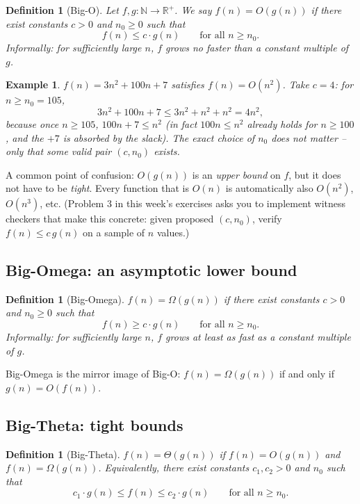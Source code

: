 \documentclass[11pt]{article}
\newtheorem{definition}[theorem]{Definition}
\newtheorem{example}[theorem]{Example}
\begin{document}
\begin{definition}[Big-O]
Let $f, g : \mathbb{N} \to \mathbb{R}^{+}$. We say $f(n) = O(g(n))$ if there exist
constants $c > 0$ and $n_0 \ge 0$ such that
\[
  f(n) \le c \cdot g(n) \qquad \text{for all } n \ge n_0.
\]
Informally: \emph{for sufficiently large $n$, $f$ grows no faster than a constant multiple
of $g$.}
\end{definition}

\begin{example}
$f(n) = 3n^2 + 100n + 7$ satisfies $f(n) = O(n^2)$. Take $c = 4$: for $n \ge n_0 = 105$,
\[
  3n^2 + 100n + 7 \le 3n^2 + n^2 + n^2 = 4n^2,
\]
because once $n \ge 105$, $100n + 7 \le n^2$ (in fact $100n \le n^2$ already holds for $n
\ge 100$, and the $+7$ is absorbed by the slack). The exact choice of $n_0$ does not matter
-- only that \emph{some} valid pair $(c, n_0)$ exists.
\end{example}

A common point of confusion: $O(g(n))$ is an \emph{upper bound} on $f$, but it does not
have to be \emph{tight}. Every function that is $O(n)$ is automatically also $O(n^2)$,
$O(n^3)$, etc. (Problem 3 in this week's exercises asks you to implement witness checkers
that make this concrete: given proposed $(c, n_0)$, verify $f(n) \le c\,g(n)$ on a sample of
$n$ values.)

\subsection{Big-Omega: an asymptotic lower bound}

\begin{definition}[Big-Omega]
$f(n) = \Omega(g(n))$ if there exist constants $c > 0$ and $n_0 \ge 0$ such that
\[
  f(n) \ge c \cdot g(n) \qquad \text{for all } n \ge n_0.
\]
Informally: \emph{for sufficiently large $n$, $f$ grows at least as fast as a constant
multiple of $g$.}
\end{definition}

Big-Omega is the mirror image of Big-O: $f(n) = \Omega(g(n))$ if and only if
$g(n) = O(f(n))$.

\subsection{Big-Theta: tight bounds}

\begin{definition}[Big-Theta]
$f(n) = \Theta(g(n))$ if $f(n) = O(g(n))$ \emph{and} $f(n) = \Omega(g(n))$. Equivalently,
there exist constants $c_1, c_2 > 0$ and $n_0$ such that
\[
  c_1 \cdot g(n) \le f(n) \le c_2 \cdot g(n) \qquad \text{for all } n \ge n_0.
\]
\end{definition}
\end{document}
